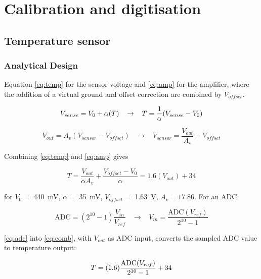 \chapter{Calibration and digitisation}\label{ch:ADC}

\section{Temperature sensor} \label{sec:ADCTemp}

	\subsection{Analytical Design} \label{sec:ADCTempAna}

Equation \ref{eq:temp} for the sensor voltage and \ref{eq:amp} for the amplifier, where the addition of a virtual ground and offset correction are combined by $V_{offset}$.

\begin{equation}
\vspace{-0.4cm}
\label{eq:temp}
V_{sense} = V_{0} + \alpha(T) \;\;\; \rightarrow \;\;\; T = \frac{1}{\alpha}(V_{sense} - V_{0})
\end{equation}

\begin{equation}
\label{eq:amp}
V_{out}=A_{v}\left({V}_{sensor}-{V}_{offset}\right) \;\;\; \rightarrow \;\;\; {V}_{sensor} = \frac{V_{out}}{A_{v}} + V_{offset}
\end{equation}

Combining \ref{eq:temp} and \ref{eq:amp} gives

\begin{equation}
\label{eq:comb}
T = \frac{V_{out}}{\alpha A_{v}} + \frac{V_{offset} - V_{0}}{\alpha} = 1.6(V_{out}) + 34
\end{equation}

for $V_{0} =$ \SI{440}{mV}, $\alpha =$ \SI{35}{mV}, $V_{offset} =$ \SI{1.63}{V}, $A_{v} = 17.86$. For an ADC:

\begin{equation}
\label{eq:adc}
\mathrm{ADC} = (2^{10}-1)\frac{V_{in}}{V_{ref}} \;\;\; \rightarrow \;\;\; V_{in} = \frac{\mathrm{ADC}(V_{ref})}{2^{10}-1}
\end{equation}

\ref{eq:adc} into \ref{eq:comb}, with $V_{out}$ as ADC input, converts the sampled ADC value to temperature output: 

\begin{equation}
\vspace{-0.4cm}
\label{eq:adctemp}
T = (1.6)\frac{\mathrm{ADC}(V_{ref})}{2^{10}-1} + 34
\end{equation}

